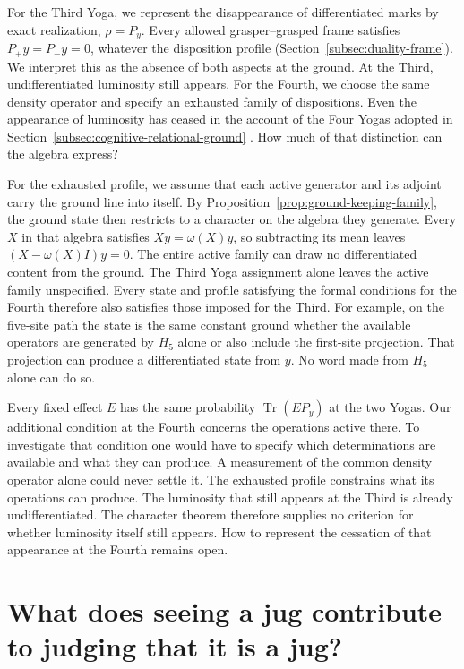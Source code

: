 \documentclass[11pt]{article}
\theoremstyle{definition}
\DeclareMathOperator{\Tr}{Tr}
\begin{document}
For the Third Yoga, we represent the disappearance of differentiated marks by exact realization, $\rho=P_y$. Every allowed grasper--grasped frame satisfies $P_+y=P_-y=0$, whatever the disposition profile (Section~\ref{subsec:duality-frame}). We interpret this as the absence of both aspects at the ground. At the Third, undifferentiated luminosity still appears. For the Fourth, we choose the same density operator and specify an exhausted family of dispositions. Even the appearance of luminosity has ceased in the account of the Four Yogas adopted in Section~\ref{subsec:cognitive-relational-ground} \cite[pp.~182--185]{Yiannopoulos2012}. How much of that distinction can the algebra express?

For the exhausted profile, we assume that each active generator and its adjoint carry the ground line into itself. By Proposition~\ref{prop:ground-keeping-family}, the ground state then restricts to a character on the algebra they generate. Every $X$ in that algebra satisfies $Xy=\omega(X)y$, so subtracting its mean leaves $(X-\omega(X)I)y=0$. The entire active family can draw no differentiated content from the ground. The Third Yoga assignment alone leaves the active family unspecified. Every state and profile satisfying the formal conditions for the Fourth therefore also satisfies those imposed for the Third. For example, on the five-site path the state is the same constant ground whether the available operators are generated by $H_5$ alone or also include the first-site projection. That projection can produce a differentiated state from $y$. No word made from $H_5$ alone can do so.

Every fixed effect $E$ has the same probability $\Tr(EP_y)$ at the two Yogas. Our additional condition at the Fourth concerns the operations active there. To investigate that condition one would have to specify which determinations are available and what they can produce. A measurement of the common density operator alone could never settle it. The exhausted profile constrains what its operations can produce. The luminosity that still appears at the Third is already undifferentiated. The character theorem therefore supplies no criterion for whether luminosity itself still appears. How to represent the cessation of that appearance at the Fourth remains open.

\section{What does seeing a jug contribute to judging that it is a jug?}
\label{sec:ordinary-cognition}
\end{document}
